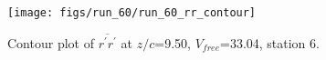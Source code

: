 \begin{figure}[H]
\centering
\texttt{[image: figs/run\_60/run\_60\_rr\_contour]}
\caption{Contour plot of $\overline{r^\prime r^\prime}$ at $z/c$=9.50, $V_{free}$=33.04, station 6.}
\end{figure}


